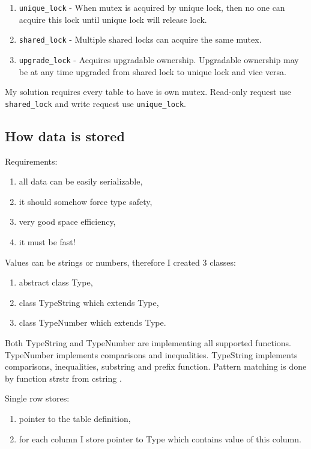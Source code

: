 \documentclass[10pt,a4paper]{article}
\begin{document}
\begin{enumerate}
\item \verb|unique_lock| - When mutex is acquired by unique lock, then no one can acquire this lock until unique lock will release lock. 
\item \verb|shared_lock| - Multiple shared locks can acquire the same mutex.
\item \verb|upgrade_lock| - Acquires upgradable ownership. Upgradable ownership may be at any time upgraded from shared lock to unique lock and vice versa.
\end{enumerate}

My solution requires every table to have is own mutex. Read-only request use \verb|shared_lock| and write request use \verb|unique_lock|.

\subsection{How data is stored}

Requirements:
\begin{enumerate}
\item all data can be easily serializable,
\item it should somehow force type safety,
\item very good space efficiency,
\item it must be fast!
\end{enumerate}
Values can be strings or numbers, therefore I created 3 classes:
\begin{enumerate}
\item abstract class Type,
\item class TypeString which extends Type,
\item class TypeNumber which extends Type.
\end{enumerate}

Both TypeString and TypeNumber are implementing all supported functions. TypeNumber implements comparisons and inequalities. TypeString implements comparisons, inequalities, substring and prefix function. Pattern matching is done by function strstr from cstring \cite{STRSTR}.
\bigskip

Single row stores:
\begin{enumerate}
\item pointer to the table definition,
\item for each column I store pointer to Type which contains value of this column.
\end{enumerate}
\end{document}
